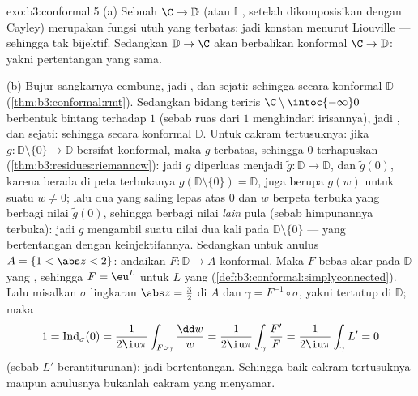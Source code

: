 \begin{solution}{exo:b3:conformal:5}
(a) Sebuah  $\C \to \mathbb D$ (atau $\mathbb H$, setelah
dikomposisikan dengan Cayley) merupakan fungsi utuh yang terbatas:
jadi konstan menurut Liouville --- sehingga tak bijektif. Sedangkan  $\mathbb
D \to \C$ akan berbalikan konformal $\C \to \mathbb D$:
yakni pertentangan yang sama.

(b) Bujur sangkarnya cembung, jadi , dan sejati:
sehingga secara konformal $\mathbb D$ (\cref{thm:b3:conformal:rmt}). Sedangkan bidang
teriris $\C\setminus\intoc{-\infty}0$ berbentuk bintang terhadap $1$
(sebab ruas dari $1$ menghindari irisannya), jadi ,
dan sejati: sehingga secara konformal $\mathbb D$. Untuk cakram tertusuknya: jika
$g \colon \mathbb D\setminus\{0\} \to \mathbb D$ bersifat
konformal, maka $g$ terbatas, sehingga $0$ terhapuskan
(\cref{thm:b3:residues:riemanncw}): jadi $g$ diperluas menjadi $\tilde g
\colon \mathbb D \to \mathbb D$, dan $\tilde g(0)$, karena berada di
peta terbukanya $g(\mathbb D\setminus\{0\}) = \mathbb D$, juga
berupa $g(w)$ untuk suatu $w \neq 0$; lalu dua  yang saling lepas
atas $0$ dan $w$ berpeta terbuka yang berbagi nilai
$\tilde g(0)$, sehingga berbagi nilai \emph{lain} pula (sebab himpunannya
terbuka): jadi $g$ mengambil suatu nilai dua kali pada
$\mathbb D\setminus\{0\}$ --- yang bertentangan dengan keinjektifannya. Sedangkan untuk
anulus $A = \{1 < \abs z < 2\}$: andaikan $F \colon \mathbb D
\to A$ konformal. Maka $F$ bebas akar pada $\mathbb D$ yang , sehingga $F = \eu^L$ untuk $L$ yang 
(\cref{def:b3:conformal:simplyconnected}). Lalu misalkan $\sigma$
lingkaran $\abs z = \frac32$ di $A$ dan $\gamma =
F^{-1}\circ\sigma$, yakni  tertutup di $\mathbb D$; maka
\[
1 = \operatorname{Ind}_\sigma(0)
= \frac1{2\iu\pi}\int_{F\circ\gamma}\frac{\dd w}{w}
= \frac1{2\iu\pi}\int_\gamma\frac{F'}{F}
= \frac1{2\iu\pi}\int_\gamma L' = 0
\]
(sebab $L'$ berantiturunan): jadi bertentangan. Sehingga baik cakram
tertusuknya maupun anulusnya bukanlah cakram yang menyamar.
\end{solution}

